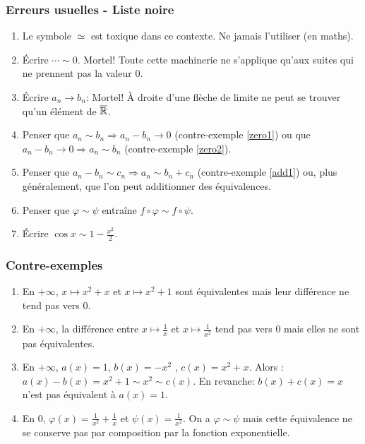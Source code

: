 \subsubsection{Erreurs usuelles - Liste noire}
\begin{enumerate}
 \item Le symbole $\simeq$ est toxique dans ce contexte. Ne jamais l'utiliser (en maths). 
 \item \'Ecrire $\cdots \sim 0$. Mortel! Toute cette machinerie ne s'applique qu'aux suites qui ne prennent pas la valeur $0$.
 \item \'Ecrire $a_n \rightarrow b_n$: Mortel! \`A droite d'une flèche de limite ne peut se trouver qu'un élément de $\overline{\mathbb{R}}$.
 \item Penser que $a_n \sim b_n \Rightarrow a_n -b_n \rightarrow 0$ (contre-exemple \ref{zero1}) ou que $a_n -b_n \rightarrow 0 \Rightarrow a_n \sim b_n$  (contre-exemple \ref{zero2}).
 \item Penser que $a_n - b_n \sim c_n \Rightarrow a_n \sim b_n + c_n$ (contre-exemple \ref{add1}) ou, plus généralement, que l'on peut additionner des équivalences.
 \item Penser que $\varphi \sim \psi$ entraîne $f\circ \varphi \sim f\circ \psi$.
 \item \'Ecrire $\cos x \sim 1 - \frac{x^2}{2}$.
\end{enumerate}

\subsubsection{Contre-exemples}
\begin{enumerate}
  \item \label{zero1} En $+\infty$, $x\mapsto x^2+x$ et $x\mapsto x^2 +1$ sont équivalentes mais leur différence ne tend pas vers $0$.
  \item \label{zero2} En $+\infty$, la différence entre $x\mapsto \frac{1}{x}$ et $x\mapsto \frac{1}{x^2}$ tend pas vers $0$ mais elles ne sont pas équivalentes.
  \item \label{add1} En $+\infty$, $a(x) = 1$, $b(x) = -x^2$ , $c(x) = x^2+x$. Alors : $a(x)-b(x) = x^2+1 \sim x^2 \sim c(x)$. En revanche: $b(x)+c(x) = x$ n'est pas équivalent à $a(x)=1$. 
  \item \label{comp1} En $0$, $\varphi(x) = \frac{1}{x^2}+\frac{1}{x}$ et $\psi(x) = \frac{1}{x^2}$. On a $\varphi \sim \psi$ mais cette équivalence ne se conserve pas par composition par la fonction exponentielle. 
\end{enumerate}
